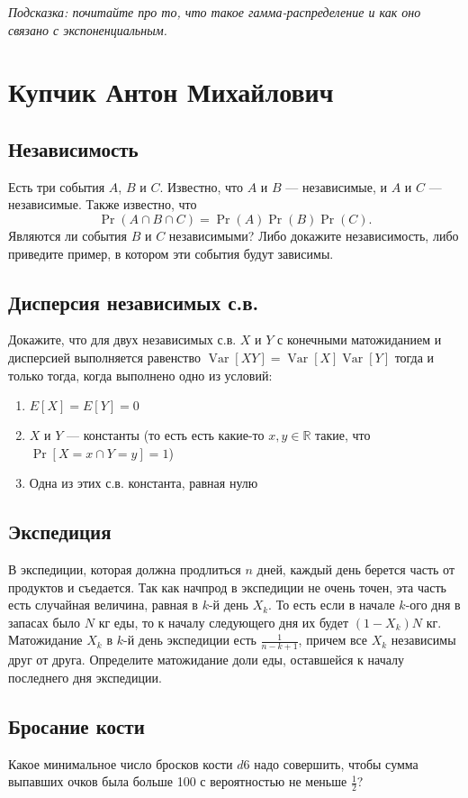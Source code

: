 \documentclass[12pt]{article}
\newcommand\R{\mathbb{R}}
\DeclareMathOperator{\Var}{Var}
\begin{document}
\emph{Подсказка: почитайте про то, что такое гамма-распределение и как оно связано с экспоненциальным.}

\newpage
\section{Купчик Антон Михайлович}

\subsection{Независимость}
Есть три события $A$, $B$ и $C$. Известно, что $A$ и $B$ --- независимые, и $A$ и $C$ --- независимые. Также известно, что \[\Pr(A \cap B \cap C) = \Pr(A)\Pr(B)\Pr(C).\] Являются ли события $B$ и $C$ независимыми? Либо докажите независимость, либо приведите пример, в котором эти события будут зависимы.

\subsection{Дисперсия независимых с.в.}
Докажите, что для двух независимых с.в. $X$ и $Y$ с конечными матожиданием и дисперсией выполняется равенство $\Var[XY] = \Var[X]\Var[Y]$ тогда и только тогда, когда выполнено одно из условий:
\begin{enumerate}
    \item $E[X] = E[Y] = 0$
    \item $X$ и $Y$ --- константы (то есть есть какие-то $x, y \in \R$ такие, что $\Pr[X = x \cap Y = y] = 1$)
    \item Одна из этих с.в. константа, равная нулю
\end{enumerate}

\subsection{Экспедиция}
В экспедиции, которая должна продлиться $n$ дней, каждый день берется часть от продуктов и съедается. Так как начпрод в экспедиции не очень точен, эта часть есть случайная величина, равная в $k$-й день $X_k$. То есть если в начале $k$-ого дня в запасах было $N$ кг еды, то к началу следующего дня их будет $(1 - X_k)N$ кг. Матожидание $X_k$ в $k$-й день экспедиции есть $\frac{1}{n - k + 1}$, причем все $X_k$ независимы друг от друга. Определите матожидание доли еды, оставшейся к началу последнего дня экспедиции.

\subsection{Бросание кости}
Какое минимальное число бросков кости $d6$ надо совершить, чтобы сумма выпавших очков была больше 100 с вероятностью не меньше $\frac{1}{2}$? 
\end{document}
